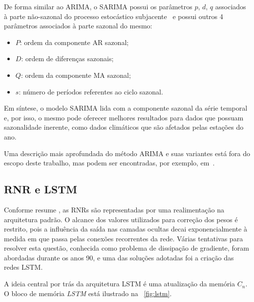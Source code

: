 \documentclass[a4paper]{ifacconf}
\begin{document}
De forma similar ao \ac{ARIMA}, o \ac{SARIMA} possui os parâmetros $p$, $d$, $q$ associados à parte não-sazonal do processo estocástico subjacente~\cite{Chen2007} e possui outros 4 parâmetros associados à parte sazonal do
mesmo: %
\begin{itemize}
	\item $P$: ordem da componente \ac{AR} sazonal;
	\item $D$: ordem de diferenças sazonais;
	\item $Q$: ordem da componente \ac{MA} sazonal;
	\item $s$: número de períodos referentes ao ciclo sazonal.
\end{itemize}
Em síntese, o modelo \ac{SARIMA} lida com a componente sazonal da série temporal e, por isso, o mesmo pode oferecer melhores resultados para dados que possuam sazonalidade inerente, como dados climáticos que são afetados pelas estações do ano.

Uma descrição mais aprofundada do método \ac{ARIMA} e suas variantes está fora do escopo deste trabalho, mas podem ser encontradas, por exemplo, em~\cite{Caloba2002, Mehdi2010, Chen2007}.

\subsection{\acs{RNR} e \ac{LSTM}}\label{subsec:lstm}

Conforme resume \cite{Teixeira2019}, as \acp{RNR} são representadas por uma realimentação na arquitetura padrão. O alcance dos valores utilizados para correção dos pesos é restrito, pois a influência da saída nas camadas ocultas decai exponencialmente à medida em que passa pelas conexões recorrentes da rede. Várias tentativas para resolver esta questão, conhecida como problema de dissipação de gradiente, foram abordadas durante os anos 90, e uma das soluções adotadas foi a criação das redes \ac{LSTM}.

A ideia central por trás da arquitetura \ac{LSTM} é uma atualização da memória $C_{n}$. O bloco de memória \textit{LSTM} está ilustrado na ~\ref{fig:lstm}.
\end{document}
